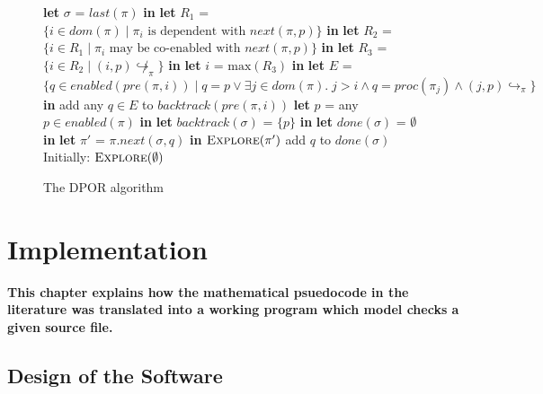 \documentclass[12pt,a4paper,twoside,openright]{report}
\newcommand{\Let}[2]{\State \textbf{let} #1 = #2 \textbf{in}}
\begin{document}
\begin{figure}
	\begin{algorithmic}[1]
		\Let{$\sigma$}{$\textit{last}(\pi)$}
		\Let{$R_1$}{$\{i \in \textit{dom}(\pi) \mid
			\pi_i \text{ is dependent with } \textit{next}(\pi, p)\}$}
		\Let{$R_2$}{$\{i \in R_1 \mid
			\pi_i \text{ may be co-enabled with } \textit{next}(\pi, p)\}$}
		\Let{$R_3$}{$\{i \in R_2 \mid (i, p)\!\not \hookrightarrow_\pi\}$}
		\Let{$i$}{$\text{max}(R_3)$}
		\Let{$E$}{$\{q \in \textit{enabled}(\textit{pre}(\pi, i)) \mid
			q = p \vee \exists j \in \textit{dom}(\pi).\; j > i \wedge
			q = \textit{proc}(\pi_j) \wedge (j, p)\hookrightarrow_\pi
			\}$}
		add any $q \in E$ to $\textit{backtrack}(\textit{pre}(\pi, i))$
		 \EndIf
		\EndIf
		\EndFor
		\Let{$p$}{any $p \in \textit{enabled}(\pi)$}
		\Let{$\textit{backtrack}(\sigma)$}{$\{p\}$}
		\Let{$\textit{done}(\sigma)$}{$\emptyset$}
		\Let{$\pi'$}{$\pi.\textit{next}(\sigma,q)$}
		\State $\textsc{Explore}(\pi')$
		\State add $q$ to $\textit{done}(\sigma)$
		\EndWhile
		\EndIf
		\EndProcedure
		\State
		\State Initially: $\textsc{Explore}(\emptyset)$
	\end{algorithmic}
	\caption{The DPOR algorithm}
	\label{dpor-outline} 
\end{figure}


\chapter{Implementation}
\textbf{This chapter explains how the mathematical
	psuedocode in the literature was translated
	into a working program which model checks a
	given source file.}

\section{Design of the Software}
\end{document}
